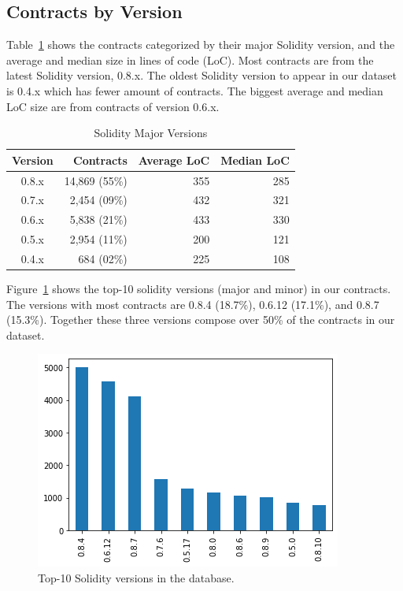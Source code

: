 \documentclass[10pt,conference]{IEEEtran}
\begin{document}
\subsection{Contracts by Version}

Table~\ref{tab:major-versions} shows the contracts categorized by their major Solidity version, and the average and median size in lines of code (LoC). Most contracts are from the latest Solidity version, 0.8.x. The oldest Solidity version to appear in our dataset is 0.4.x which has fewer amount of contracts. The biggest average and median LoC size are from contracts of version 0.6.x.

\begin{table}
\center
  \caption{Solidity Major Versions}
  \label{tab:major-versions}
  \begin{tabular}{crrr}
    \hline
    Version & Contracts & Average LoC & Median LoC \\
    \hline
    0.8.x & 14,869 (55\%) & 355 & 285 \\
    0.7.x & 2,454 (09\%) & 432 & 321 \\
    0.6.x & 5,838 (21\%) & 433 & 330 \\
    0.5.x & 2,954 (11\%) & 200 & 121 \\
    0.4.x & 684  (02\%) & 225 & 108 \\
  \hline
\end{tabular}
\end{table}

Figure~\ref{fig:minor-versions} shows the top-10 solidity versions (major and minor) in our contracts. The versions with most contracts are 0.8.4 (18.7\%), 0.6.12 (17.1\%), and 0.8.7 (15.3\%). Together these three versions compose over 50\% of the contracts in our dataset.

\begin{figure}[h]
  \centering
  \includegraphics[width=\linewidth]{img/versions_clean.png}
  \caption{Top-10 Solidity versions in the database.}
  \label{fig:minor-versions}
\end{figure}
\end{document}
